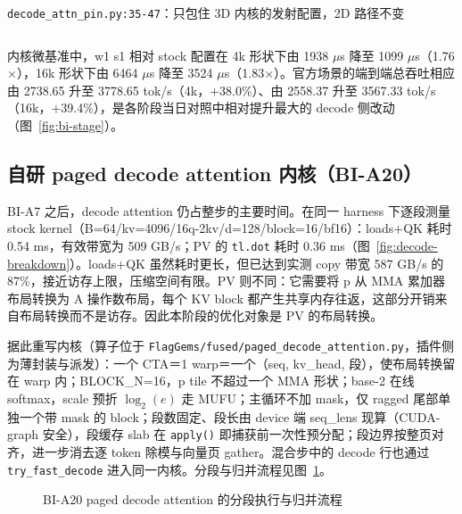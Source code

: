 \documentclass[11pt,a4paper]{ctexart}
\newcommand{\PluginCode}{../pkg_build/XLANG2026/vllm-plugin-FL}%
\newcommand{\PluginCode}{../../XLANG2026/vllm-plugin-FL}%
\begin{document}
\begin{reportcode}{\texttt{decode\_attn\_pin.py:35-47}：只包住 3D 内核的发射配置，2D 路径不变}
\inputminted[linenos,fontsize=\scriptsize,breaklines,tabsize=4,firstline=35,lastline=47]{python}{\PluginCode/vllm_fl/dispatch/backends/vendor/iluvatar/impl/decode_attn_pin.py}
\end{reportcode}

内核微基准中，w1 s1 相对 stock 配置在 4k 形状下由 1938 $\mu$s 降至 1099 $\mu$s（1.76$\times$），16k 形状下由 6464 $\mu$s 降至 3524 $\mu$s（1.83$\times$）。官方场景的端到端总吞吐相应由 2738.65 升至 3778.65 tok/s（4k，+38.0\%）、由 2558.37 升至 3567.33 tok/s（16k，+39.4\%），是各阶段当日对照中相对提升最大的 decode 侧改动（图~\ref{fig:bi-stage}）。

\subsection{自研 paged decode attention 内核（BI-A20）}\label{sec:bi-a20}
BI-A7 之后，decode attention 仍占整步的主要时间。在同一 harness 下逐段测量 stock kernel（B=64/kv=4096/16q-2kv/d=128/block=16/bf16）：loads+QK 耗时 0.54 ms，有效带宽为 509 GB/s；PV 的 \texttt{tl.dot} 耗时 0.36 ms（图~\ref{fig:decode-breakdown}）。loads+QK 虽然耗时更长，但已达到实测 copy 带宽 587 GB/s 的 87\%，接近访存上限，压缩空间有限。PV 则不同：它需要将 p 从 MMA 累加器布局转换为 A 操作数布局，每个 KV block 都产生共享内存往返，这部分开销来自布局转换而不是访存。因此本阶段的优化对象是 PV 的布局转换。

据此重写内核（算子位于 \texttt{FlagGems/fused/paged\_decode\_attention.py}，插件侧为薄封装与派发）：一个 CTA＝1 warp＝一个（seq, kv\_head, 段），使布局转换留在 warp 内；BLOCK\_N=16，p tile 不超过一个 MMA 形状；base-2 在线 softmax，scale 预折 $\log_2(e)$ 走 MUFU；主循环不加 mask，仅 ragged 尾部单独一个带 mask 的 block；段数固定、段长由 device 端 seq\_lens 现算（CUDA-graph 安全），段缓存 slab 在 \texttt{apply()} 即捕获前一次性预分配；段边界按整页对齐，进一步消去逐 token 除模与向量页 gather。混合步中的 decode 行也通过 \texttt{try\_fast\_decode} 进入同一内核。分段与归并流程见图~\ref{fig:a20-flow}。

\begin{figure}[!htbp]
\centering
{}
\caption{BI-A20 paged decode attention 的分段执行与归并流程\label{fig:a20-flow}}
\end{figure}
\end{document}
